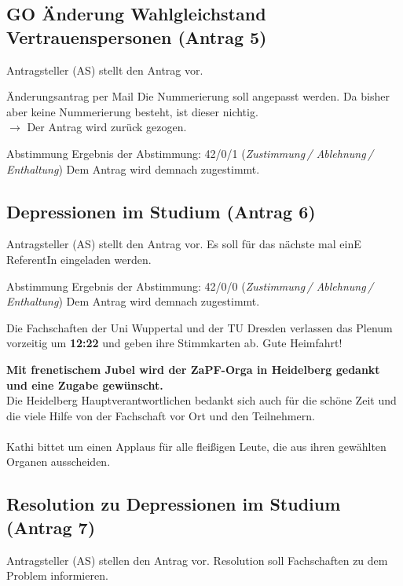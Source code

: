   \subsection*{GO Änderung Wahlgleichstand Vertrauenspersonen (Antrag 5)}
    Antragsteller (AS) stellt den Antrag vor. \\
    \begin{danger}{Änderungsantrag per Mail}
      Die Nummerierung soll angepasst werden. Da bisher aber keine Nummerierung besteht, ist dieser nichtig. \\
      $\rightarrow$ Der Antrag wird zurück gezogen.
    \end{danger}

    \begin{success}{Abstimmung}
      Ergebnis der Abstimmung: 42/0/1 (\textit{Zustimmung\,/ Ablehnung\,/ Enthaltung})
      Dem Antrag wird demnach zugestimmt.
    \end{success}

  \subsection*{Depressionen im Studium (Antrag 6)}
    Antragsteller (AS) stellt den Antrag vor. Es soll für das nächste mal einE ReferentIn eingeladen werden.\\

    \begin{success}{Abstimmung}
      Ergebnis der Abstimmung: 42/0/0 (\textit{Zustimmung\,/ Ablehnung\,/ Enthaltung})
      Dem Antrag wird demnach zugestimmt.
    \end{success}

    \begin{info}{}
      Die Fachschaften der Uni Wuppertal und der TU Dresden verlassen das Plenum vorzeitig um \textbf{12:22} und geben ihre Stimmkarten ab. Gute Heimfahrt!
    \end{info}

    \textbf{Mit frenetischem Jubel wird der ZaPF-Orga in Heidelberg gedankt und eine Zugabe gewünscht.} \\
    Die Heidelberg Hauptverantwortlichen bedankt sich auch für die schöne Zeit und die viele Hilfe von der Fachschaft vor Ort und den Teilnehmern. \\ \\
    Kathi bittet um einen Applaus für alle fleißigen Leute, die aus ihren gewählten Organen ausscheiden.

  \subsection*{Resolution zu Depressionen im Studium (Antrag 7)}
    Antragsteller (AS) stellen den Antrag vor. Resolution soll Fachschaften zu dem Problem informieren.

